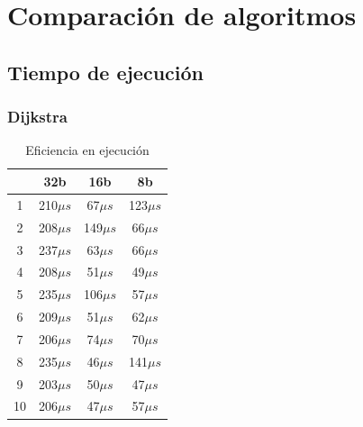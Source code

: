 \chapter{Comparaci\'on de algoritmos}

\section{Tiempo de ejecuci\'on}

\subsection{Dijkstra}
\begin{table}[H]
\label{tablax}
\begin{center}
\begin{tabular}{|c|c|c|c|}
\hline 
 &32b&16b&8b \\
\hline
1 & 210$\mu s$ & 67$\mu s$ & 123$\mu s$ \\ \hline
2& 208$\mu s$& 149$\mu s$ & 66$\mu s$ \\ \hline
3& 237$\mu s$ & 63$\mu s$ & 66$\mu s$ \\ \hline
4& 208$\mu s$ & 51$\mu s$ & 49$\mu s$ \\ \hline
5& 235$\mu s$ & 106$\mu s$ & 57$\mu s$ \\ \hline
6&209$\mu s$ & 51$\mu s$ & 62$\mu s$ \\ \hline
7& 206$\mu s$ & 74$\mu s$ & 70$\mu s$ \\ \hline
8&235$\mu s$ & 46$\mu s$ & 141$\mu s$ \\ \hline
9& 203$\mu s$ & 50$\mu s$ & 47$\mu s$ \\ \hline
10& 206$\mu s$ & 47$\mu s$ & 57$\mu s$ \\ \hline
\end{tabular}
\end{center}
\caption{Eficiencia en ejecuci\'on}
\end{table}

